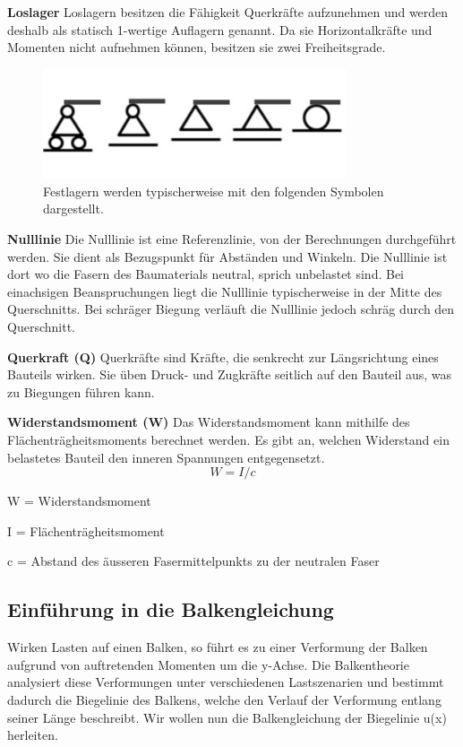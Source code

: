 \textbf{Loslager}
Loslagern besitzen die Fähigkeit Querkräfte aufzunehmen und werden deshalb als statisch 1-wertige Auflagern genannt.
Da sie Horizontalkräfte und Momenten nicht aufnehmen können, besitzen sie zwei Freiheitsgrade.
\begin{figure} [h]
	\centering
	\includegraphics[width=0.8\textwidth]{papers/balken/images/teil1/Loslager.jpg}
	\caption{Festlagern werden typischerweise mit den folgenden Symbolen dargestellt.}
	\label{fig:Loslagern werden typischerweise mit den folgenden Symbolen dargestellt.}
\end{figure}

\textbf{Nulllinie}
Die Nulllinie ist eine Referenzlinie, von der Berechnungen durchgeführt werden. Sie dient als Bezugspunkt für Abständen und Winkeln.
Die Nulllinie ist dort wo die Fasern des Baumaterials neutral, sprich unbelastet sind.
Bei einachsigen Beanspruchungen liegt die Nulllinie typischerweise in der Mitte des Querschnitts.
Bei schräger Biegung verläuft die Nulllinie jedoch schräg durch den Querschnitt.

\textbf{Querkraft (Q)}
Querkräfte sind Kräfte, die senkrecht zur Längsrichtung eines Bauteils wirken.
Sie üben Druck- und Zugkräfte seitlich auf den Bauteil aus, was zu Biegungen führen kann.

\textbf{Widerstandsmoment (W)}
Das Widerstandsmoment kann mithilfe des Flächenträgheitsmoments berechnet werden.
Es gibt an, welchen Widerstand ein belastetes Bauteil den inneren Spannungen entgegensetzt.
\begin{equation}
W=I/c
\end{equation}

W = Widerstandsmoment

I = Flächenträgheitsmoment

c = Abstand des äusseren Fasermittelpunkts zu der neutralen Faser

\subsection{Einführung in die Balkengleichung}
Wirken Lasten auf einen Balken, so führt es zu einer Verformung der Balken aufgrund von auftretenden Momenten um die y-Achse.
Die Balkentheorie analysiert diese Verformungen unter verschiedenen Lastszenarien und bestimmt dadurch die Biegelinie des Balkens, welche den Verlauf der Verformung entlang seiner Länge beschreibt.
Wir wollen nun die Balkengleichung der Biegelinie u(x) herleiten.

